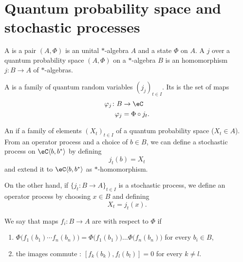 \section{Quantum probability space and stochastic processes}

A  is a pair $(A,\Phi)$ is an unital $*$-algebra $A$ and a state $\Phi$ on $A$. A  $j$ over a quantum probability space $(A,\Phi)$ on a $*$-algebra $B$ is an homomorphism $j\colon B\to A$ of $*$-algebras.

A  is a family of quantum random variables $(j_j)_{t\in I}$. Its  is the set of maps
\begin{equation}
    \begin{aligned}
        \varphi_j\colon B&\to \eC \\
        \varphi_j&=\Phi\circ j_t. 
    \end{aligned}
\end{equation}

An  if a family of elements $(X_t)_{t\in I}$ of a quantum probability space ($X_t\in A$). From an operator process and a choice of $b\in B$, we can define a stochastic process on $\eC\langle b,b^*\rangle$ by defining
\begin{equation}
    j_t(b)=X_t
\end{equation}
and extend it to $\eC\langle b,b^*\rangle$ as $*$-homomorphism.

On the other hand, if $\{ j_t\colon B\to A \}_{t\in I}$ is a stochastic process, we define an operator process by choosing $x\in B$ and defining
\begin{equation}
    X_t=j_t(x).
\end{equation}

\begin{definition}
    We say that maps $f_i\colon B\to A$ are  with respect to $\Phi$ if 
    \begin{enumerate}
        \item
            $\Phi\big( f_1(b_1)\cdots f_n(b_n) \big)=\Phi\big( f_1(b_1) \big)\ldots\Phi\big( f_n(b_n) \big)$ for every $b_i\in B$,
        \item
            the images commute : $[f_k(b_k),f_l(b_l)]=0$ for every $k\neq l$.
    \end{enumerate}
\end{definition}

